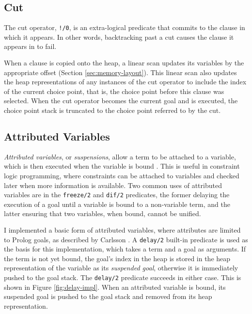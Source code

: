 \subsection{Cut}

The cut operator, \texttt{!/0}, is an extra-logical predicate that commits to the clause in which it appears. In other words, backtracking past a cut causes the clause it appears in to fail.

When a clause is copied onto the heap, a linear scan updates its variables by the appropriate offset (Section \ref{sec:memory-layout}). This linear scan also updates the heap representations of any instances of the cut operator to include the index of the current choice point, that is, the choice point before this clause was selected. When the cut operator becomes the current goal and is executed, the choice point stack is truncated to the choice point referred to by the cut.

\subsection{Attributed Variables}

\label{sec:attributed-variables}

\emph{Attributed variables}, or \emph{suspensions}, allow a term to be attached to a variable, which is then executed when the variable is bound \cite{holzbaurMetastructuresvsattributed1992}. This is useful in constraint logic programming, where constraints can be attached to variables and checked later when more information is available. Two common uses of attributed variables are in the \texttt{freeze/2} and \texttt{dif/2} predicates, the former delaying the execution of a goal until a variable is bound to a non-variable term, and the latter ensuring that two variables, when bound, cannot be unified.

I implemented a basic form of attributed variables, where attributes are limited to Prolog goals, as described by Carlsson \cite{carlssonimplementationdiffreeze1986}. A \texttt{delay/2} built-in predicate is used as the basis for this implementation, which takes a term and a goal as arguments. If the term is not yet bound, the goal's index in the heap is stored in the heap representation of the variable as its \emph{suspended goal}, otherwise it is immediately pushed to the goal stack. The \texttt{delay/2} predicate succeeds in either case. This is shown in Figure \ref{fig:delay-impl}. When an attributed variable is bound, its suspended goal is pushed to the goal stack and removed from its heap representation.

